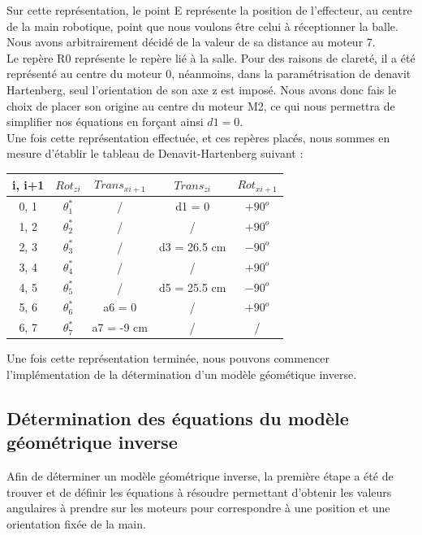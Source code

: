 Sur cette représentation, le point E représente la position de l'effecteur, au centre de la main robotique, point que nous voulons être celui à réceptionner la balle. Nous avons arbitrairement décidé de la valeur de sa distance au moteur 7.\\

Le repère R0 représente le repère lié à la salle. Pour des raisons de clareté, il a été représenté au centre du moteur 0, néanmoins, dans la paramétrisation de denavit Hartenberg, seul l'orientation de son axe z est imposé. Nous avons donc fais le choix de placer son origine au centre du moteur M2, ce qui nous permettra de simplifier nos équations en forçant ainsi $d1 = 0$.\\

Une fois cette représentation effectuée, et ces repères placés, nous sommes en mesure d'établir le tableau de Denavit-Hartenberg suivant :\\

\begin{tabular}{|c|c|c|c|c|}
\hline
i, i+1 & $Rot_{zi}$ & $Trans_{xi+1}$ & $Trans_{zi}$ & $Rot_{xi+1}$\\
\hline   
0, 1 & $\theta_1^*$ & / & d1 = 0 & $+90^o$        \\
1, 2 & $\theta_2^*$ & / & / & $+90^o$\\
2, 3 & $\theta_3^*$ & / & d3 = 26.5 cm & $-90^o$\\
3, 4 & $\theta_4^*$ & / & / & $+90^o$\\
4, 5 & $\theta_5^*$ & / & d5 = 25.5 cm& $-90^o$\\
5, 6 & $\theta_6^*$ & a6 = 0 & / & $+90^o$\\
6, 7 & $\theta_7^*$ & a7 = -9 cm & / & / \\
\hline
\end{tabular}

Une fois cette représentation terminée, nous pouvons commencer l'implémentation de la détermination d'un modèle géométique inverse.

\subsection{Détermination des équations du modèle géométrique inverse}

Afin de déterminer un modèle géométrique inverse, la première étape a été de trouver et de définir les équations à résoudre permettant d'obtenir les valeurs angulaires à prendre sur les moteurs pour correspondre à une position et une orientation fixée de la main.\\


